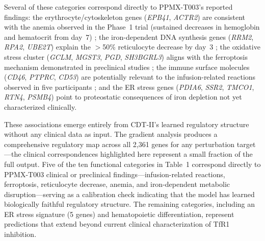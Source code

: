 \documentclass[12pt,a4paper]{article}
\begin{document}
Several of these categories correspond directly to PPMX-T003's reported findings: the erythrocyte/cytoskeleton genes (\textit{EPB41}, \textit{ACTR2}) are consistent with the anemia observed in the Phase~1 trial (sustained decreases in hemoglobin and hematocrit from day~7) \citep{ogama2023}; the iron-dependent DNA synthesis genes (\textit{RRM2}, \textit{RPA2}, \textit{UBE2T}) explain the $>$50\% reticulocyte decrease by day~3 \citep{ogama2023}; the oxidative stress cluster (\textit{GCLM}, \textit{MGST3}, \textit{PGD}, \textit{SH3BGRL3}) aligns with the ferroptosis mechanism demonstrated in preclinical studies \citep{fauzi2025}; the immune surface molecules (\textit{CD46}, \textit{PTPRC}, \textit{CD53}) are potentially relevant to the infusion-related reactions observed in five participants \citep{ogama2023}; and the ER stress genes (\textit{PDIA6}, \textit{SSR2}, \textit{TMCO1}, \textit{RTN4}, \textit{PSMB4}) point to proteostatic consequences of iron depletion not yet characterized clinically.

These associations emerge entirely from CDT-II's learned regulatory structure without any clinical data as input. The gradient analysis produces a comprehensive regulatory map across all 2,361 genes for any perturbation target---the clinical correspondences highlighted here represent a small fraction of the full output. Five of the ten functional categories in Table~1 correspond directly to PPMX-T003 clinical or preclinical findings---infusion-related reactions, ferroptosis, reticulocyte decrease, anemia, and iron-dependent metabolic disruption---serving as a calibration check indicating that the model has learned biologically faithful regulatory structure. The remaining categories, including an ER stress signature (5 genes) and hematopoietic differentiation, represent predictions that extend beyond current clinical characterization of TfR1 inhibition.
\end{document}
